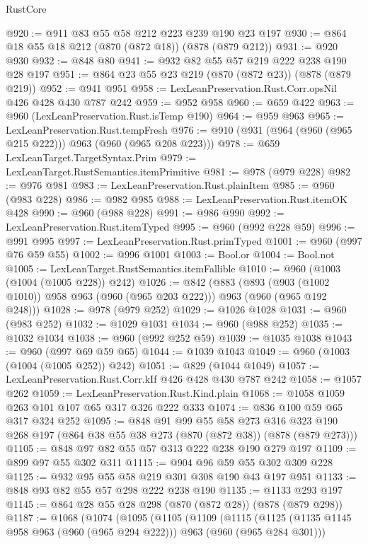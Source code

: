 \begin{lexlean}{RustCore}
\begin{coremodule}
@920 := @911 @83 @55 @58 @212 @223 @239 @190 @23 @197
@930 := @864 @18 @55 @18 @212 (@870 (@872 @18)) (@878 (@879 @212))
@931 := @920 @930
@932 := @848 @80
@941 := @932 @82 @55 @57 @219 @222 @238 @190 @28 @197
@951 := @864 @23 @55 @23 @219 (@870 (@872 @23)) (@878 (@879 @219))
@952 := @941 @951
@958 := LexLeanPreservation.Rust.Corr.opsNil @426 @428 @430 @787 @242
@959 := @952 @958
@960 := @659 @422
@963 := @960 (LexLeanPreservation.Rust.isTemp @190)
@964 := @959 @963
@965 := LexLeanPreservation.Rust.tempFresh
@976 := @910 (@931 (@964 (@960 (@965 @215 @222))) @963 (@960 (@965 @208 @223)))
@978 := @659 LexLeanTarget.TargetSyntax.Prim
@979 := LexLeanTarget.RustSemantics.itemPrimitive
@981 := @978 (@979 @228)
@982 := @976 @981
@983 := LexLeanPreservation.Rust.plainItem
@985 := @960 (@983 @228)
@986 := @982 @985
@988 := LexLeanPreservation.Rust.itemOK @428
@990 := @960 (@988 @228)
@991 := @986 @990
@992 := LexLeanPreservation.Rust.itemTyped
@995 := @960 (@992 @228 @59)
@996 := @991 @995
@997 := LexLeanPreservation.Rust.primTyped
@1001 := @960 (@997 @76 @59 @55)
@1002 := @996 @1001
@1003 := Bool.or
@1004 := Bool.not
@1005 := LexLeanTarget.RustSemantics.itemFallible
@1010 := @960 (@1003 (@1004 (@1005 @228)) @242)
@1026 := @842
    (@883
      (@893 (@903 (@1002 @1010)) @958 @963 (@960 (@965 @203 @222)))
      @963
      (@960 (@965 @192 @248)))
@1028 := @978 (@979 @252)
@1029 := @1026 @1028
@1031 := @960 (@983 @252)
@1032 := @1029 @1031
@1034 := @960 (@988 @252)
@1035 := @1032 @1034
@1038 := @960 (@992 @252 @59)
@1039 := @1035 @1038
@1043 := @960 (@997 @69 @59 @65)
@1044 := @1039 @1043
@1049 := @960 (@1003 (@1004 (@1005 @252)) @242)
@1051 := @829 (@1044 @1049)
@1057 := LexLeanPreservation.Rust.Corr.kIf @426 @428 @430 @787 @242
@1058 := @1057 @262
@1059 := LexLeanPreservation.Rust.Kind.plain
@1068 := @1058 @1059 @263 @101 @107 @65 @317 @326 @222 @333
@1074 := @836 @100 @59 @65 @317 @324 @252
@1095 := @848
    @91
    @99
    @55
    @58
    @273
    @316
    @323
    @190
    @268
    @197
    (@864 @38 @55 @38 @273 (@870 (@872 @38)) (@878 (@879 @273)))
@1105 := @848 @97 @82 @55 @57 @313 @222 @238 @190 @279 @197
@1109 := @899 @97 @55 @302 @311
@1115 := @904 @96 @59 @55 @302 @309 @228
@1125 := @932 @95 @55 @58 @219 @301 @308 @190 @43 @197 @951
@1133 := @848 @93 @82 @55 @57 @298 @222 @238 @190
@1135 := @1133 @293 @197
@1145 := @864 @28 @55 @28 @298 (@870 (@872 @28)) (@878 (@879 @298))
@1187 := @1068
    (@1074
      (@1095
        (@1105
          (@1109
            (@1115
              (@1125 (@1135 @1145 @958 @963 (@960 (@965 @294 @222))) @963 (@960 (@965 @284 @301)))

\end{coremodule}
\end{lexlean}
